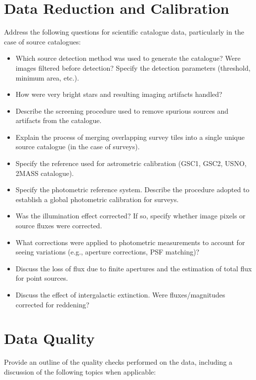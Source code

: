 \documentclass[a4paper,10pt]{book}
\begin{document}
\section{Data Reduction and Calibration}

Address the following questions for scientific catalogue data, particularly in the case of source catalogues:

\begin{itemize}
\item Which source detection method was used to generate the catalogue? Were images filtered before detection? Specify the detection parameters (threshold, minimum area, etc.).
\item How were very bright stars and resulting imaging artifacts handled?
\item Describe the screening procedure used to remove spurious sources and artifacts from the catalogue.
\item Explain the process of merging overlapping survey tiles into a single unique source catalogue (in the case of surveys).
\item Specify the reference used for astrometric calibration (GSC1, GSC2, USNO, 2MASS catalogue).
\item Specify the photometric reference system. Describe the procedure adopted to establish a global photometric calibration for surveys.
\item Was the illumination effect corrected? If so, specify whether image pixels or source fluxes were corrected.
\item What corrections were applied to photometric measurements to account for seeing variations (e.g., aperture corrections, PSF matching)?
\item Discuss the loss of flux due to finite apertures and the estimation of total flux for point sources.
\item Discuss the effect of intergalactic extinction. Were fluxes/magnitudes corrected for reddening?
\end{itemize}

\section{Data Quality}

Provide an outline of the quality checks performed on the data, including a discussion of the following topics when applicable:
\end{document}
